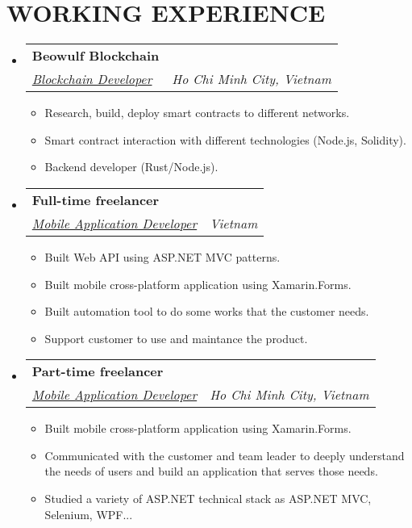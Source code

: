 \documentclass[letterpaper,11pt]{article}
\makeatletter
\newcommand{\resumeItem}[1]{
	\item\small{
		{#1 \vspace{-2pt}}
	}
}
\newcommand{\resumeSubheading}[4]{
	\vspace{-2pt}\item
	\begin{tabular*}{1.0\textwidth}[t]{l@{\extracolsep{\fill}}r}
		\textbf{\large#1} & \textbf{\small #2} \\
		\textit{\large#3} & \textit{\small #4} \\

	\end{tabular*}\vspace{-7pt}
}
\newcommand{\resumeSubHeadingListStart}{\begin{itemize}[leftmargin=0.0in, label={}]}
\newcommand{\resumeSubHeadingListEnd}{\end{itemize}}
\newcommand{\resumeItemListStart}{\begin{itemize}}
\newcommand{\resumeItemListEnd}{\end{itemize}\vspace{-5pt}}
\makeatother
\begin{document}
\section{WORKING EXPERIENCE}
\resumeSubHeadingListStart

\resumeSubheading
{Beowulf Blockchain \href{https://beowulfchain.com/}{\raisebox{-0.1\height}\faExternalLink}}{} %
{\underline{Blockchain Developer}}{Ho Chi Minh City, Vietnam}
\resumeItemListStart
\resumeItem{\normalsize{Research, build, deploy smart contracts to different networks.}}
\resumeItem{\normalsize{Smart contract interaction with different technologies (Node.js, Solidity).}}
\resumeItem{\normalsize{Backend developer (Rust/Node.js).}}
\resumeItemListEnd


\resumeSubheading
{Full-time freelancer \href{https://phnaharris.github.io}{\raisebox{-0.1\height}\faExternalLink}}{} %
{\underline{Mobile Application Developer}}{Vietnam}
\resumeItemListStart
\resumeItem{\normalsize{Built Web API using ASP.NET MVC patterns.}}
\resumeItem{\normalsize{Built mobile cross-platform application using Xamarin.Forms.}}
\resumeItem{\normalsize{Built automation tool to do some works that the customer needs.}}
\resumeItem{\normalsize{Support customer to use and maintance the product.}}
\resumeItemListEnd

\resumeSubheading
{Part-time freelancer \href{https://phnaharris.github.io}{\raisebox{-0.1\height}\faExternalLink}}{} %
{\underline{Mobile Application Developer}}{Ho Chi Minh City, Vietnam}
\resumeItemListStart
\resumeItem{\normalsize{Built mobile cross-platform application using Xamarin.Forms.}}
\resumeItem{\normalsize{Communicated with the customer and team leader to deeply understand the needs of users and build an application that serves those needs.}}
\resumeItem{\normalsize{Studied a variety of ASP.NET technical stack as ASP.NET MVC, Selenium, WPF...}}

\resumeItemListEnd

\resumeSubHeadingListEnd
\vspace{-12pt}


\end{document}
